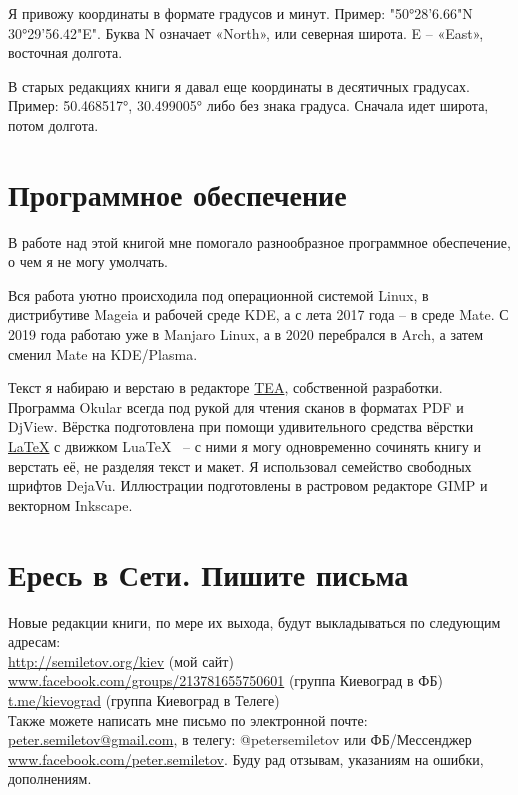Я привожу координаты в формате градусов и минут. Пример: "50°28'6.66"N 30°29'56.42"E". Буква N означает «North», или северная широта. E – «East», восточная долгота.

В старых редакциях книги я давал еще координаты в десятичных градусах. Пример: 50.468517°, 30.499005° либо без знака градуса. Сначала идет широта, потом долгота. 

\section*{Программное обеспечение} 

В работе над этой книгой мне помогало разнообразное программное обеспечение, о чем я не могу умолчать.

Вся работа уютно происходила под операционной системой Linux, в дистрибутиве Mageia и рабочей среде KDE, а с лета 2017 года – в среде Mate. С 2019 года работаю уже в Manjaro Linux, а в 2020 перебрался в Arch, а затем сменил Mate на KDE/Plasma. 

Текст я набираю и верстаю в редакторе \href{http://semiletov.org/tea}{TEA}, собственной разработки. Программа Okular всегда под рукой для чтения сканов в форматах PDF и DjView. Вёрстка подготовлена при помощи удивительного средства вёрстки \href{http://www.latex-project.org/}{\LaTeX} с движком Lua\TeX~ – с ними я могу одновременно сочинять книгу и верстать её, не разделяя текст и макет. Я использовал семейство свободных шрифтов DejaVu. Иллюстрации подготовлены в растровом редакторе GIMP и векторном Inkscape.




\section*{Ересь в Сети. Пишите письма}

Новые редакции книги, по мере их выхода, будут выкладываться по следующим адресам:\\ 

\noindent
\href{http://semiletov.org/kiev}{http://semiletov.org/kiev} (мой сайт)\\
\href{https://www.facebook.com/groups/213781655750601/}{www.facebook.com/groups/213781655750601} (группа Киевоград в ФБ)\\
\href{https://t.me/kievograd}{t.me/kievograd} (группа Киевоград в Телеге)\\

Также можете написать мне письмо по электронной почте: \href{peter.semiletov@gmail.com}{peter.semiletov@gmail.com}, 
в телегу: @petersemiletov или ФБ/Мессенджер \href{https://www.facebook.com/peter.semiletov}{www.facebook.com/peter.semiletov}. Буду рад отзывам, указаниям на ошибки, дополнениям.
